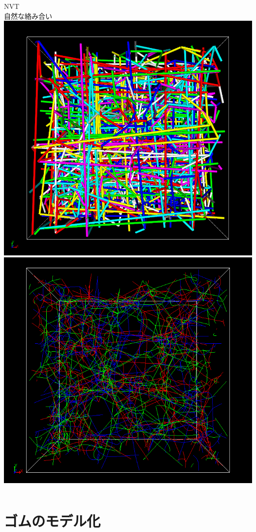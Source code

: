 \documentclass[12pt, dvipdfmx]{beamer}
\begin{document}
\begin{frame}
\begin{columns}[c, onlytextwidth]
    \end{columns}
    \vspace{3mm}
    \begin{columns}[c, onlytextwidth]
        NVT\\
        自然な絡み合い
        \centering
            \includegraphics[width=.8\textwidth]{z_cord_4Chain.png}
        \centering
            \includegraphics[width=.8\textwidth]{N48_f4_PPA.png}
    \end{columns}
\end{frame}

\section{ゴムのモデル化}
\end{document}
